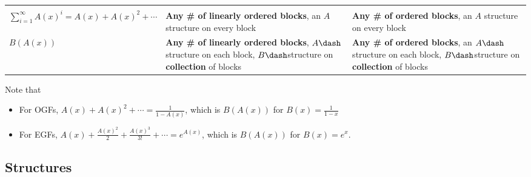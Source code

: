 \begin{longtable}[]{@{}lll@{}}
\begin{minipage}[t]{0.30\columnwidth}
\end{minipage}\tabularnewline
\begin{minipage}[t]{0.30\columnwidth}\raggedright
\(\displaystyle\sum_{i=1}^\infty A(x)^i = A(x) + A(x)^2 + \cdots\)\strut
\end{minipage} & \begin{minipage}[t]{0.30\columnwidth}\raggedright
\textbf{Any \# of linearly ordered blocks}, an \(A\) structure on every
block\strut
\end{minipage} & \begin{minipage}[t]{0.30\columnwidth}\raggedright
\textbf{Any \# of ordered blocks}, an \(A\) structure on every
block\strut
\end{minipage}\tabularnewline
\begin{minipage}[t]{0.30\columnwidth}\raggedright
\(B(A(x))\)\strut
\end{minipage} & \begin{minipage}[t]{0.30\columnwidth}\raggedright
\textbf{Any \# of linearly ordered blocks}, \(A\dash\)structure on each
block, \(B\dash\)structure on \textbf{collection} of blocks\strut
\end{minipage} & \begin{minipage}[t]{0.30\columnwidth}\raggedright
\textbf{Any \# of ordered blocks}, an \(A\dash\)structure on each block,
\(B\dash\)structure on \textbf{collection} of blocks\strut
\end{minipage}\tabularnewline
\bottomrule
\end{longtable}

Note that

\begin{itemize}
\tightlist
\item
  For OGFs, \(A(x) + A(x)^2 + \cdots = \frac{1}{1-A(x)}\), which is
  \(B(A(x))\) for \(B(x) = \frac{1}{1-x}\)
\item
  For EGFs,
  \(A(x) + \frac{A(x)^2}{2} + \frac{A(x)^3}{3!} + \cdots = e^{A(x)}\),
  which is \(B(A(x))\) for \(B(x) = e^x\).
\end{itemize}

\hypertarget{structures}{%
\subsection{Structures}\label{structures}}

